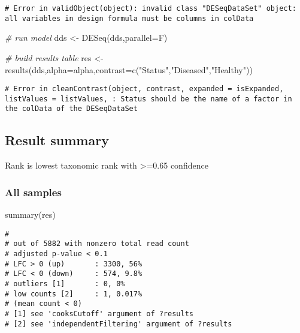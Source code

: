 \documentclass[
]{article}
\newenvironment{Shaded}{\begin{snugshade}}{\end{snugshade}}
\newcommand{\AttributeTok}[1]{\textcolor[rgb]{0.77,0.63,0.00}{#1}}
\newcommand{\CommentTok}[1]{\textcolor[rgb]{0.56,0.35,0.01}{\textit{#1}}}
\newcommand{\FunctionTok}[1]{\textcolor[rgb]{0.00,0.00,0.00}{#1}}
\newcommand{\NormalTok}[1]{#1}
\newcommand{\OtherTok}[1]{\textcolor[rgb]{0.56,0.35,0.01}{#1}}
\newcommand{\StringTok}[1]{\textcolor[rgb]{0.31,0.60,0.02}{#1}}
\begin{document}
\begin{verbatim}
# Error in validObject(object): invalid class "DESeqDataSet" object: all variables in design formula must be columns in colData
\end{verbatim}

\begin{Shaded}
\begin{Highlighting}[]
\CommentTok{\# run model}
\NormalTok{dds }\OtherTok{\textless{}{-}} \FunctionTok{DESeq}\NormalTok{(dds,}\AttributeTok{parallel=}\NormalTok{F)}

\CommentTok{\# build results table}
\NormalTok{res }\OtherTok{\textless{}{-}} \FunctionTok{results}\NormalTok{(dds,}\AttributeTok{alpha=}\NormalTok{alpha,}\AttributeTok{contrast=}\FunctionTok{c}\NormalTok{(}\StringTok{"Status"}\NormalTok{,}\StringTok{"Diseased"}\NormalTok{,}\StringTok{"Healthy"}\NormalTok{))}
\end{Highlighting}
\end{Shaded}

\begin{verbatim}
# Error in cleanContrast(object, contrast, expanded = isExpanded, listValues = listValues, : Status should be the name of a factor in the colData of the DESeqDataSet
\end{verbatim}

\hypertarget{result-summary}{%
\subsection{Result summary}\label{result-summary}}

Rank is lowest taxonomic rank with \textgreater=0.65 confidence

\hypertarget{all-samples}{%
\subsubsection{All samples}\label{all-samples}}

\begin{Shaded}
\begin{Highlighting}[]
\FunctionTok{summary}\NormalTok{(res)}
\end{Highlighting}
\end{Shaded}

\begin{verbatim}
# 
# out of 5882 with nonzero total read count
# adjusted p-value < 0.1
# LFC > 0 (up)       : 3300, 56%
# LFC < 0 (down)     : 574, 9.8%
# outliers [1]       : 0, 0%
# low counts [2]     : 1, 0.017%
# (mean count < 0)
# [1] see 'cooksCutoff' argument of ?results
# [2] see 'independentFiltering' argument of ?results
\end{verbatim}
\end{document}
